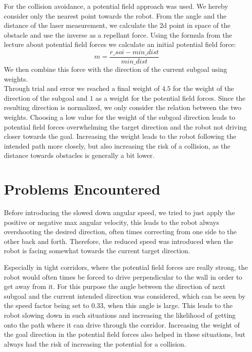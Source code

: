 \documentclass[
	fontsize=12pt,
	headings=small,
	parskip=half,           %
	bibliography=totoc,
	numbers=noenddot,       %
	open=any,               %
]{scrreprt}
\begin{document}
For the collision avoidance, a potential field approach was used. We hereby consider only the nearest point towards the robot.
From the angle and the distance of the laser measurement, we calculate the 2d point in space of the obstacle and use the inverse as a repellant force.
Using the formula from the lecture about potential field forces we calculate an initial potential field force:
\begin{equation*}
	m = \frac{r\_soi - min\_dist}{min\_dist}
\end{equation*}
We then combine this force with the direction of the current subgoal using weights.\\
Through trial and error we reached a final weight of $4.5$ for the weight of the direction of the subgoal and $1$ as a weight for the potential field forces.
Since the resulting direction is normalized, we only consider the relation between the two weights.
Choosing a low value for the weight of the subgoal direction leads to potential field forces overwhelming the target direction and the robot not driving closer towards the goal.
Increasing the weight leads to the robot following the intended path more closely, but also increasing the risk of a collision, as the distance towards obstacles is generally a bit lower.

\section{Problems Encountered}


Before introducing the slowed down angular speed, we tried to just apply the positive or negative max angular velocity, this leads to the robot always overshooting the desired direction, often times correcting from one side to the other back and forth.
Therefore, the reduced speed was introduced when the robot is facing somewhat towards the current target direction.

Especially in tight corridors, where the potential field forces are really strong, the robot would often times be forced to drive perpendicular to the wall in order to get away from it.
For this purpose the angle between the direction of next subgoal and the current intended direction was considered, which can be seen by the speed factor being set to $0.33$, when this angle is large.
This leads to the robot slowing down in such situations and increasing the likelihood of getting onto the path where it can drive through the corridor.
Increasing the weight of the goal direction in the potential field forces also helped in these situations, but always had the risk of increasing the potential for a collision.
\end{document}
